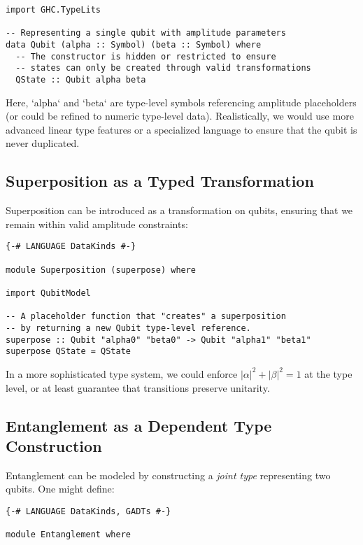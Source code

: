 \documentclass[12pt]{article}
\begin{document}
\begin{itemize}[label=$\bullet$]
\begin{lstlisting}[caption={A simplified model for a Qubit and its superposition states}, label={lst:qubit_model}]
import GHC.TypeLits

-- Representing a single qubit with amplitude parameters
data Qubit (alpha :: Symbol) (beta :: Symbol) where
  -- The constructor is hidden or restricted to ensure
  -- states can only be created through valid transformations
  QState :: Qubit alpha beta
\end{lstlisting}

Here, `alpha` and `beta` are type-level symbols referencing amplitude placeholders (or could be refined to numeric type-level data). Realistically, we would use more advanced linear type features or a specialized language to ensure that the qubit is never duplicated.

\subsection{Superposition as a Typed Transformation}
Superposition can be introduced as a transformation on qubits, ensuring that we remain within valid amplitude constraints:

\begin{lstlisting}[caption={Haskell function to create a superposition}, label={lst:superposition}]
{-# LANGUAGE DataKinds #-}

module Superposition (superpose) where

import QubitModel

-- A placeholder function that "creates" a superposition
-- by returning a new Qubit type-level reference.
superpose :: Qubit "alpha0" "beta0" -> Qubit "alpha1" "beta1"
superpose QState = QState
\end{lstlisting}

In a more sophisticated type system, we could enforce \(\lvert \alpha \rvert^2 + \lvert \beta \rvert^2 = 1\) at the type level, or at least guarantee that transitions preserve unitarity.

\subsection{Entanglement as a Dependent Type Construction}
Entanglement can be modeled by constructing a \emph{joint type} representing two qubits. One might define:

\begin{lstlisting}[caption={A simplified entangled pair construction}, label={lst:entanglement}]
{-# LANGUAGE DataKinds, GADTs #-}

module Entanglement where


\end{lstlisting}
\end{itemize}
\end{document}
